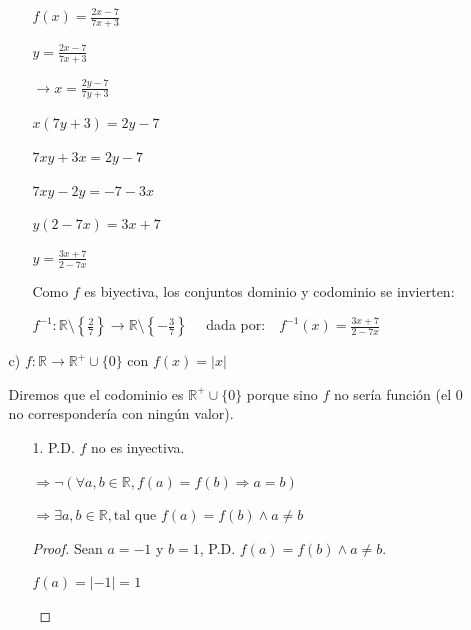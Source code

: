 \documentclass{article}
\begin{document}
\begin{enumerate}
\begin{enumerate}
\begin{enumerate}
                \( f(x) = \frac{2x - 7}{7x + 3} \)
            
                \( y = \frac{2x - 7}{7x + 3} \)
                \vspace{\baselineskip}
                
                \(\rightarrow x = \frac{2y - 7}{7y + 3} \)
                
                \( x(7y + 3) = 2y - 7 \)
                
                \( 7xy + 3x = 2y - 7 \)
                
                \( 7xy - 2y = -7 - 3x \)
                
                \( y(2 - 7x) = 3x + 7 \)
                
                \( y = \frac{3x + 7}{2 - 7x} \)
                \vspace{\baselineskip}
                
                Como \( f \) es biyectiva, los conjuntos dominio y codominio se invierten:
                
                \( f^{-1} : \mathbb{R} \setminus \left\{\frac{2}{7}\right\} \rightarrow \mathbb{R} \setminus \left\{-\frac{3}{7}\right\} \quad \) dada por:\( \quad f^{-1}(x) = \frac{3x + 7}{2 - 7x} \)
            \end{enumerate}
            \vspace{\baselineskip}
            
        \item[c)] \(f: \mathbb{R} \rightarrow \mathbb{R}^+ \cup \{0\} \text{ con } f(x) = \lvert x \rvert\)
        
        Diremos que el codominio es \(\mathbb{R}^+ \cup \{0\}\) porque sino \(f\) no sería función (el 0 no correspondería con ningún valor).
        \begin{enumerate}
            \item[1.] P.D. \(f\) no es inyectiva.

            \(\Rightarrow \neg (\forall a, b \in \mathbb{R}, f(a) = f(b) \Rightarrow a = b)\)
            
            \(\Rightarrow \exists a, b \in \mathbb{R}, \text{tal que } f(a) = f(b) \land a \neq b\)
            \vspace{\baselineskip}

            \begin{proof} Sean \(a = -1\) y \(b = 1\), P.D. \(f(a) = f(b) \land a \neq b\).
            \begin{multicols}{2}
                \(f(a)=|-1|=1\)
                

\end{multicols}
\end{proof}
\end{enumerate}
\end{enumerate}
\end{enumerate}
\end{document}
